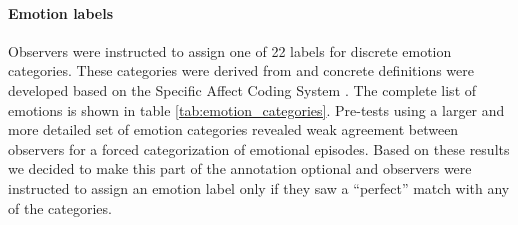 \documentclass[10pt,a4paper,twocolumn]{article}
\begin{document}
\paragraph{Emotion labels}

Observers were instructed to assign one of 22 labels for discrete emotion
categories. These categories were derived from \cite{Ort1990} and concrete
definitions were developed based on the Specific Affect Coding System
\cite{CG2007}. The complete list of emotions is shown in table
\ref{tab:emotion_categories}.  Pre-tests using a larger and more detailed set
of emotion categories revealed weak agreement between observers for a forced
categorization of emotional episodes. Based on these results we decided to make
this part of the annotation optional and observers were instructed to assign an
emotion label only if they saw a ``perfect'' match with any of the categories.
\end{document}
